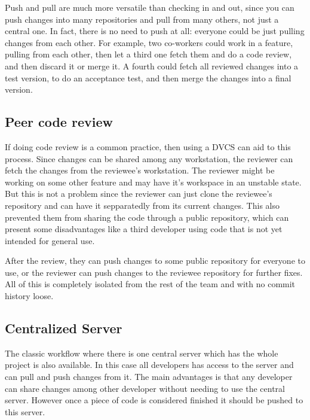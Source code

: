 Push and pull are much more versatile than checking in and out, since you can push 
changes into many repositories and pull from many others, not just a central one.
In fact, there is no need to push at all:
everyone could be just pulling changes from each other. For example, two co-workers could work 
in a feature, pulling from each other, then let a third one fetch them and do a code review, and then 
discard it or merge it. A fourth could fetch all reviewed changes into a test version, to do an 
acceptance test, and then merge the changes into a final version.

\subsection{Peer code review}
If doing code review is a common practice, then using a DVCS can aid to this process. Since changes can be shared
among any workstation, the reviewer can fetch the changes from the reviewee's workstation. The reviewer might be
working on some other feature and may have it's workspace in an unstable state. But this is not a problem since the
reviewer can just clone the reviewee's repository and can have it sepparatedly from its current changes.
This also prevented them from sharing the code through a public repository, which can present some disadvantages like
a third developer using code that is not yet intended for general use.

After the review, they can push changes to some public repository for everyone to use, or the reviewer can push changes to the reviewee repository for further fixes. All of this is completely isolated from the rest of the team and with no commit history loose.


\subsection{Centralized Server}
The classic workflow where there is one central server which has the whole project is also available. In this case all developers has access to the server and can pull and push changes from it. The main advantages is that any developer can share changes among other developer without needing to use the central server. However once a piece of code is considered finished it should be pushed to this server.



